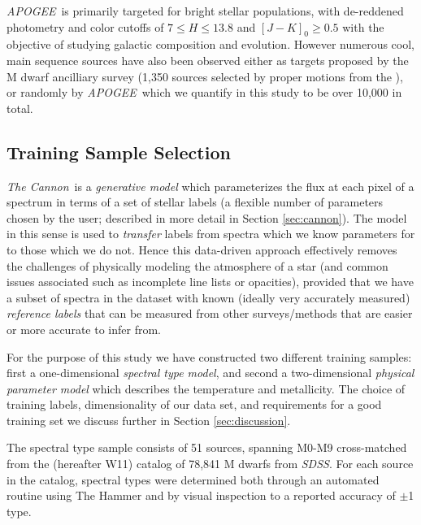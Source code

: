\documentclass[modern]{aastex62}
\newcommand{\apogee}{\textsl{APOGEE}}
\newcommand{\thecannon}{\textsl{The Cannon}}
\newcommand{\sdss}{\textsl{SDSS}}
\begin{document}
\apogee\ is primarily targeted for bright stellar populations, with de-reddened photometry and color cutoffs of $7 \leq H \leq 13.8$ and $[J-K]_0 \geq 0.5$ \citep{Zasowski:2013} with the objective of studying galactic composition and evolution. However numerous cool, main sequence sources have also been observed either as targets proposed by the M dwarf ancilliary survey (1,350 sources selected by proper motions from the  \citealt{Desphande:2013}), or randomly by \apogee\, which we quantify in this study to be over 10,000 in total.


\subsection{Training Sample Selection}

\thecannon\ is a \emph{generative model} which parameterizes the flux at each pixel of a spectrum in terms of a set of stellar labels (a flexible number of parameters chosen by the user; described in more detail in Section \ref{sec:cannon}). The model in this sense is used to \emph{transfer} labels from spectra which we know parameters for to those which we do not. Hence this data-driven approach effectively removes the challenges of physically modeling the atmosphere of a star (and common issues associated such as incomplete line lists or opacities), provided that we have a subset of spectra in the dataset with known (ideally very accurately measured) \emph{reference labels} that can be measured from other surveys/methods that are easier or more accurate to infer from. 

For the purpose of this study we have constructed two different training samples: first a one-dimensional \emph{spectral type model}, and second a two-dimensional \emph{physical parameter model} which describes the temperature and metallicity. The choice of training labels, dimensionality of our data set, and requirements for a good training set we discuss further in Section \ref{sec:discussion}.

The spectral type sample consists of 51 sources, spanning M0-M9 cross-matched from the \citealt{West:2011} (hereafter W11) catalog of 78,841 M dwarfs from \sdss. For each source in the catalog, spectral types were determined both through an automated routine using The Hammer \citep{Covey:2007} and by visual inspection to a reported accuracy of $\pm$1 type.
\end{document}
